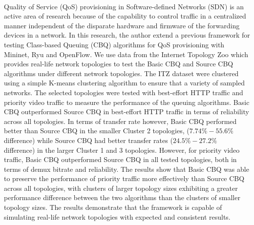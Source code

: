 \begin{thesisabstract}
\paragraph{         } Quality of Service (QoS) provisioning in Software-defined Networks (SDN) is an active area of research because of the capability to control traffic in a centralized manner independent of the disparate hardware and firmware of the forwarding devices in a network. In this research, the author extend a previous framework for testing Class-based Queuing (CBQ) algorithms for QoS provisioning with Mininet, Ryu and OpenFlow. We use data from the Internet Topology Zoo which provides real-life network topologies to test the Basic CBQ and Source CBQ algorithms under different network topologies. The ITZ dataset were clustered using a simple K-means clustering algorithm to ensure that a variety of sampled networks. The selected topologies were tested with best-effort HTTP traffic and priority video traffic to measure the performance of the queuing algorithms. Basic CBQ outperformed Source CBQ in best-effort HTTP traffic in terms of reliability across all topologies. In terms of transfer rate however, Basic CBQ performed better than Source CBQ in the smaller Cluster 2 topologies, ($7.74\%-55.6\%$ difference) while Source CBQ had better transfer rates ($24.5\%-27.2\%$ difference) in the larger Cluster 1 and 3 topologies. However, for priority video traffic, Basic CBQ outperformed Source CBQ in all tested topologies, both in terms of demux bitrate and reliability. The results show that Basic CBQ was able to preserve the performance of priority traffic more effectively than Source CBQ across all topologies, with clusters of larger topology sizes exhibiting a greater performance difference between the two algorithms than the clusters of smaller topology sizes. The results demonstrate that the framework is capable of simulating real-life network topologies with expected and consistent results.
\end{thesisabstract}
